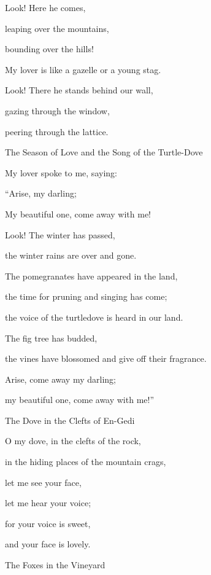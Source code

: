 {\par }{\Q Look! Here
he comes,
\par }{\Q leaping
over
the mountains,
\par }{\Q bounding
over
the hills!
\par }{\Q {}My lover
is like
a gazelle
or
a young
stag.
\par }{\Q Look! There
he stands
behind
our wall,
\par }{\Q gazing
through
the window,
\par }{\Q peering
through
the lattice.
\par }{\SH The Season of Love and the Song of the Turtle-Dove
\par }{\SH 
{}
\par }{\Q {}My lover
spoke to me, saying:
\par }{\Q “Arise,
my darling;
\par }{\Q My beautiful
one, come away with me!
\par }{\Q {}Look! The winter
has passed,
\par }{\Q the winter
rains
are over and gone.
\par }{\Q {}The pomegranates
have appeared
in the land,
\par }{\Q the time
for pruning and singing
has come;
\par }{\Q the voice
of the turtledove
is heard
in our land.
\par }{\Q {}The fig tree
has budded,
\par }{\Q the vines
have blossomed
and give
off their fragrance.
\par }{\Q Arise,
come away
my darling;
\par }{\Q my beautiful
one, come away with me!”
\par }{\SH The Dove in the Clefts of En-Gedi
\par }{\SH 
{}
\par }{\Q {}O my dove,
in the clefts
of the rock,
\par }{\Q in the hiding places
of the mountain crags,
\par }{\Q let me see
your face,
\par }{\Q let me hear
your voice;
\par }{\Q for
your voice
is sweet,
\par }{\Q and your face
is lovely.
\par }{\SH The Foxes in the Vineyard
\par }{\SH 
}
